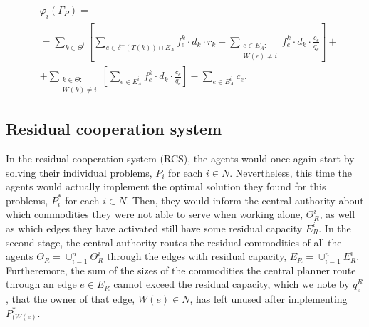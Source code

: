 \documentclass{article}
\begin{document}
\begin{equation}
    \begin{split}
    & \varphi_i(\Gamma_P) =\label{eq:PartialCooperationPayoff} \\
    & = \sum_{k\in \Theta^i} \left[ \sum_{e \in \delta^-(T(k))\cap E_A} f_e^k \cdot d_k \cdot r_k -  \sum_{\substack{e\in E_A \colon\\ W(e)\not = i}} f_e^k \cdot d_k \cdot \frac{c_e}{q_e} \right] + \\
    & + \sum_{\substack{k \in \Theta  \colon \\ W(k) \not = i}} \left[\sum_{e \in E_A^i} f_e^k \cdot d_k \cdot \frac{c_e}{q_e}\right] - \sum_{e \in E_A^i} c_e.
    \end{split}
\end{equation}

\subsection{Residual cooperation system}

In the residual cooperation system (RCS), the agents would once again start by solving their individual problems, $P_i$ for each $i\in N$. Nevertheless, this time the agents  would actually implement the optimal solution they found for this problems, $P_i^*$ for each $i\in N$. Then, they would inform the central authority about which commodities they were not able to serve when working alone, $\Theta_R^i$, as well as which edges they have activated still have some residual capacity $E_R^i$. In the second stage, the central authority routes the residual commodities of all the agents $\Theta_R = \cup_{i=1}^n \Theta_R^i$ through the edges with residual capacity, $E_R=\cup_{i=1}^n E_R^i$. Furtheremore, the sum of the sizes of the commodities the central planner route through an edge $e\in E_R$ cannot exceed the residual capacity, which we note by $q_e^R$, that the owner of that edge, $W(e)\in N$, has left unused after implementing $P_{(W(e)}^*$.
\end{document}
